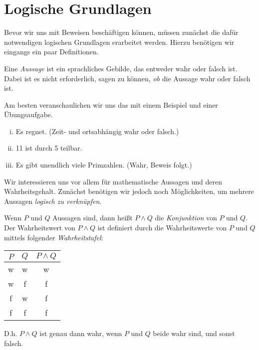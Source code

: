 \chapter{Logische Grundlagen}

Bevor wir uns mit Beweisen beschäftigen können, müssen zunächst die dafür notwendigen logischen
Grundlagen erarbeitet werden. Hierzu benötigen wir eingangs ein paar Definitionen.

\begin{mydef}
Eine \textit{Aussage} ist ein sprachliches Gebilde, das entweder wahr oder falsch ist.
    Dabei ist es nicht erforderlich, sagen zu können, \textit{ob} die Aussage wahr oder falsch ist.
\end{mydef}  

Am besten veranschaulichen wir uns das mit einem Beispiel und einer Übungsaufgabe.

\begin{example}
    \begin{enumerate}[(i)]
        \item
        Es regnet. (Zeit- und ortsabhängig wahr oder falsch.)
        \item
        11 ist durch 5 teilbar.
        \item
        Es gibt unendlich viele Primzahlen. (Wahr, Beweis folgt.)
    \end{enumerate}
\end{example} 

Wir interessieren uns vor allem für mathematische Aussagen und deren Wahrheitsgehalt.
Zunächst benötigen wir jedoch noch Möglichkeiten, um mehrere Aussagen \textit{logisch zu verknüpfen}.

\begin{mydef}
    Wenn $P$ und $Q$ Aussagen sind, dann heißt $P \wedge Q$ die \textit{Konjunktion} von $P$ und $Q$.
    Der Wahrheitswert von $P \wedge Q$ ist definiert durch die Wahrheitswerte von $P$ und $Q$ mittels
    folgender \textit{Wahrheitstafel}: \newline
    \begin{tabular}{ c | c | c }
        $P$ & $Q$ & $P \wedge Q$ \\
        \hline
        w & w & w \\
        w & f & f \\
        f & w & f \\
        f & f & f \\
    \end{tabular}
    \newline 
    D.h. $P \wedge Q$ ist genau dann wahr, wenn $P$ und $Q$ beide wahr sind, und sonst falsch.
\end{mydef}

